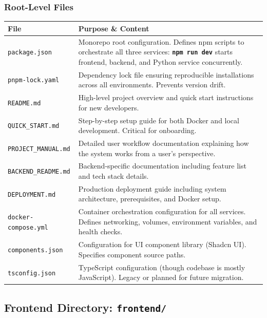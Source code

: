 \documentclass[12pt,a4paper,oneside]{article}
\newcommand{\fileref}[1]{\texttt{#1}}
\newcommand{\funcname}[1]{\texttt{\textbf{#1}}}
\begin{document}
\subsubsection{Root-Level Files}

\begin{table}[H]
\centering
\begin{tabular}{|p{3cm}|p{11cm}|}
\hline
\textbf{File} & \textbf{Purpose \& Content} \\
\hline
\fileref{package.json} & Monorepo root configuration. Defines npm scripts to orchestrate all three services: \funcname{npm run dev} starts frontend, backend, and Python service concurrently. \\
\hline
\fileref{pnpm-lock.yaml} & Dependency lock file ensuring reproducible installations across all environments. Prevents version drift. \\
\hline
\fileref{README.md} & High-level project overview and quick start instructions for new developers. \\
\hline
\fileref{QUICK\_START.md} & Step-by-step setup guide for both Docker and local development. Critical for onboarding. \\
\hline
\fileref{PROJECT\_MANUAL.md} & Detailed user workflow documentation explaining how the system works from a user's perspective. \\
\hline
\fileref{BACKEND\_README.md} & Backend-specific documentation including feature list and tech stack details. \\
\hline
\fileref{DEPLOYMENT.md} & Production deployment guide including system architecture, prerequisites, and Docker setup. \\
\hline
\fileref{docker-compose.yml} & Container orchestration configuration for all services. Defines networking, volumes, environment variables, and health checks. \\
\hline
\fileref{components.json} & Configuration for UI component library (Shadcn UI). Specifies component source paths. \\
\hline
\fileref{tsconfig.json} & TypeScript configuration (though codebase is mostly JavaScript). Legacy or planned for future migration. \\
\hline
\end{tabular}
\end{table}

\newpage

\subsection{Frontend Directory: \fileref{frontend/}}
\end{document}
